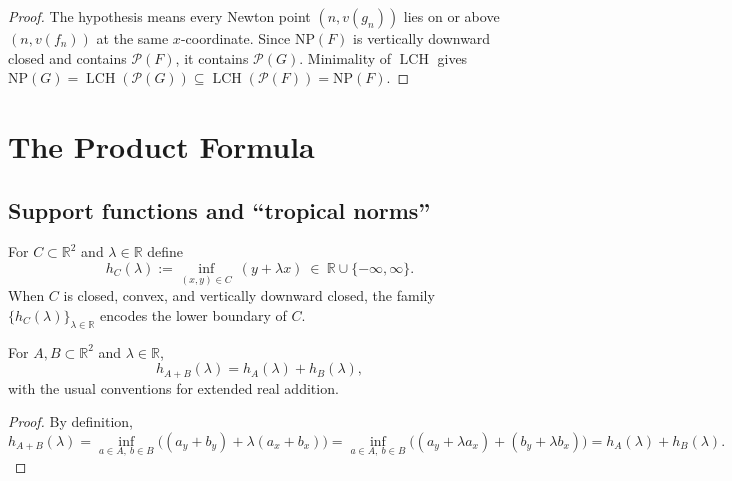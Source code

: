\begin{proof}
 
  \leanok
  The hypothesis means every Newton point $(n,v(g_n))$ lies on or above $(n,v(f_n))$ at the same $x$-coordinate.
  Since $\mathrm{NP}(F)$ is vertically downward closed and contains $\mathcal{P}(F)$, it contains $\mathcal{P}(G)$.
  Minimality of $\operatorname{LCH}$ gives $\mathrm{NP}(G)=\operatorname{LCH}(\mathcal{P}(G))\subseteq \operatorname{LCH}(\mathcal{P}(F))=\mathrm{NP}(F)$.
\end{proof}

\section{The Product Formula}

\subsection{Support functions and “tropical norms”}

\begin{definition}
  \label{def:support_function_lower}
  
  \uses{}
  \leanok
  
  
  For $C\subset\mathbb{R}^2$ and $\lambda\in\mathbb{R}$ define
  \[
    h_C(\lambda) := \inf_{(x,y)\in C}\ (y+\lambda x)\ \in\ \mathbb{R}\cup\{-\infty,\infty\}.
  \]
  When $C$ is closed, convex, and vertically downward closed, the family $\{h_C(\lambda)\}_{\lambda\in\mathbb{R}}$
  encodes the lower boundary of $C$.
\end{definition}

\begin{lemma}
  \label{lem:support_minkowski}
  
  \leanok
  
  
  For $A,B\subset\mathbb{R}^2$ and $\lambda\in\mathbb{R}$,
  \[
    h_{A+B}(\lambda)=h_A(\lambda)+h_B(\lambda),
  \]
  with the usual conventions for extended real addition.
\end{lemma}

\begin{proof}
 
  \leanok
  By definition,
  \[
    h_{A+B}(\lambda)=\inf_{a\in A,\ b\in B}\big((a_y+b_y)+\lambda(a_x+b_x)\big)
    =\inf_{a\in A,\ b\in B}\big((a_y+\lambda a_x)+(b_y+\lambda b_x)\big)
    =h_A(\lambda)+h_B(\lambda).
  \]
\end{proof}

